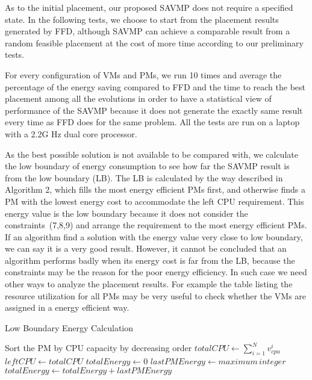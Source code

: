 \documentclass[10pt, conference, compsocconf]{IEEEtran}
\begin{document}
As to the initial placement, our proposed SAVMP does not require a specified
state. In the following tests, we choose to start from the placement results
generated by FFD, although SAVMP can achieve a comparable result from a random
feasible placement at the cost of more time according to our preliminary
tests.

For every configuration of VMs and PMs, we run 10 times and average the 
percentage of the energy saving compared to FFD and the time to reach the best
placement among all the evolutions in order to have a statistical view of performance of the SAVMP
because it does not generate the exactly same result every time as FFD does for
the same problem. All the tests are run on a laptop with a 2.2G Hz dual core
processor.

As the best possible solution is not available to be compared with, we calculate
the low boundary of energy consumption to see how far the SAVMP result is from
the low boundary (LB). The LB is calculated by the way described in Algorithm 2,
which fills the most energy efficient PMs first, and otherwise finds a PM with
the lowest energy cost to accommodate the left CPU requirement. This energy
value is the low boundary because it does not consider the
constraints~(7,8,9) and arrange the requirement to the most energy efficient
PMs.
If an algorithm find a solution with the energy value very close to low boundary, we can say it is a very good result. However, it cannot
be concluded that an algorithm performs badly when its energy cost is far from
the LB, because the constraints may be the reason for the poor energy
efficiency. In such case we need other ways to analyze the placement results.
For example the table listing the resource utilization for all PMs may be very
useful to check whether the VMs are assigned in a energy efficient way.

\begin{algorithm}
\SetAlgoLined
\LinesNumbered
\caption{Low Boundary Energy Calculation}
	Sort the PM by CPU capacity by decreasing order \;
	$totalCPU\leftarrow \sum_{i=1}^Nv_{cpu}^i $ \;
	$leftCPU\leftarrow totalCPU$\;
	$totalEnergy\leftarrow 0$ \;
	$lastPMEnergy\leftarrow maximum\, integer$ \;	
	$totalEnergy\leftarrow totalEnergy + lastPMEnergy$ \;
\end{algorithm}
\end{document}
